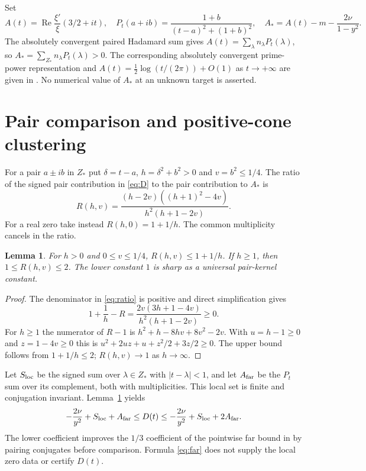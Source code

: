 \documentclass[11pt,a4paper]{article}
\newtheorem{lemma}[theorem]{Lemma}
\begin{document}
Set
\begin{equation}\label{eq:A}
 A(t)=\operatorname{Re}\frac{\xi'}{\xi}(3/2+it),\quad P_t(a+ib)=\frac{1+b}{(t-a)^2+(1+b)^2},\quad A_*=A(t)-m-\frac{2\nu}{1-y^2}.
\end{equation}
The absolutely convergent paired Hadamard sum gives $A(t)=\sum_\lambda n_\lambda P_t(\lambda)$, so $A_*=\sum_{Z_*}n_\lambda P_t(\lambda)>0$. The corresponding absolutely convergent prime-power representation and $A(t)=\frac12\log(t/(2\pi))+O(1)$ as $t\to+\infty$ are given in \cite{laguerre}. No numerical value of $A_*$ at an unknown target is asserted.

\section{Pair comparison and positive-cone clustering}\label{sec:cone}
For a pair $a\pm ib$ in $Z_*$ put $\delta=t-a$, $h=\delta^2+b^2>0$ and $v=b^2\le1/4$. The ratio of the signed pair contribution in \eqref{eq:D} to the pair contribution to $A_*$ is
\begin{equation}\label{eq:ratio}
 R(h,v)=\frac{(h-2v)((h+1)^2-4v)}{h^2(h+1-2v)}.
\end{equation}
For a real zero take instead $R(h,0)=1+1/h$. The common multiplicity cancels in the ratio.
\begin{lemma}\label{lem:compare}
For $h>0$ and $0\le v\le1/4$, $R(h,v)\le1+1/h$. If $h\ge1$, then $1\le R(h,v)\le2$. The lower constant $1$ is sharp as a universal pair-kernel constant.
\end{lemma}
\begin{proof}
The denominator in \eqref{eq:ratio} is positive and direct simplification gives
\[
 1+\frac1h-R=\frac{2v(3h+1-4v)}{h^2(h+1-2v)}\ge0.
\]
For $h\ge1$ the numerator of $R-1$ is $h^2+h-8hv+8v^2-2v$. With $u=h-1\ge0$ and $z=1-4v\ge0$ this is $u^2+2uz+u+z^2/2+3z/2\ge0$. The upper bound follows from $1+1/h\le2$; $R(h,v)\to1$ as $h\to\infty$.
\end{proof}
Let $S_{\rm loc}$ be the signed sum over $\lambda\in Z_*$ with $|t-\lambda|<1$, and let $A_{\rm far}$ be the $P_t$ sum over its complement, both with multiplicities. This local set is finite and conjugation invariant. Lemma~\ref{lem:compare} yields
\begin{equation}\label{eq:far}
 -\frac{2\nu}{y^2}+S_{\rm loc}+A_{\rm far}\le D(t)\le-\frac{2\nu}{y^2}+S_{\rm loc}+2A_{\rm far}.
\end{equation}
The lower coefficient improves the $1/3$ coefficient of the pointwise far bound in \cite{laguerre} by pairing conjugates before comparison. Formula \eqref{eq:far} does not supply the local zero data or certify $D(t)$.
\end{document}
